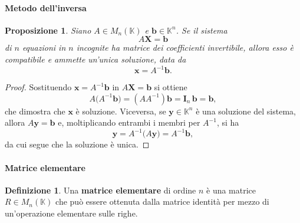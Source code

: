 \documentclass{article}
\theoremstyle{plain}
\newtheorem{prop}[thm]{Proposizione}
\theoremstyle{definition}
\newtheorem{defn}{Definizione}[section]
\theoremstyle{remark}
\begin{document}
\vspace{10pt}

\paragraph{Metodo dell'inversa}
\begin{bxthm}
\begin{prop}
Siano $A\in M_n(\mathbb{K})$ e $\mathbf{b}\in\mathbb{K}^n$. Se il sistema
\[
A\mathbf{X}=\mathbf{b}
\]
di $n$ equazioni in $n$ incognite ha matrice dei coefficienti invertibile, allora esso è compatibile e ammette un'unica soluzione, data da
\[
\mathbf{x}=A^{-1}\mathbf{b}.
\]
\end{prop}
\end{bxthm}
\begin{proof}
Sostituendo $\mathbf{x}=A^{-1}\mathbf{b}$ in $A\mathbf{X}=\mathbf{b}$ si ottiene
\[
A\bigl(A^{-1}\mathbf{b}\bigr)= (AA^{-1})\mathbf{b}=\mathbf{I}_n\,\mathbf{b}=\mathbf{b},
\]
che dimostra che $\mathbf{x}$ è soluzione. Viceversa, se $\mathbf{y}\in\mathbb{K}^n$ è una soluzione del sistema, allora $A\mathbf{y}=\mathbf{b}$ e, moltiplicando entrambi i membri per $A^{-1}$, si ha
\[
\mathbf{y}=A^{-1}\bigl(A\mathbf{y}\bigr)=A^{-1}\mathbf{b},
\]
da cui segue che la soluzione è unica.
\end{proof}

\vspace{10pt}

\paragraph{Matrice elementare}
\begin{bxthm}
\begin{defn}
    Una \textbf{matrice elementare} di ordine \(n\) è una matrice \(R \in M_n(\mathbb{K})\) che può essere ottenuta dalla matrice identità per mezzo di un'operazione elementare sulle righe. 
\end{defn}
\end{bxthm}

\vspace{10pt}
\end{document}
